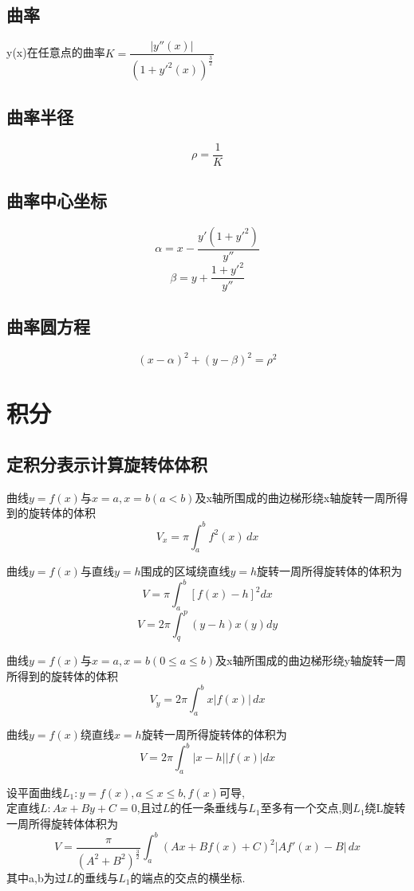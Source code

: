\subsection{曲率}
y(x)在任意点的曲率\(K = \dfrac{|y''(x)|}{(1 + y'^2(x))^{\frac{3}{2}}}\)

\subsection{曲率半径}
\[\rho = \dfrac{1}{K}\]

\subsection{曲率中心坐标}
\[\alpha = x - \dfrac{y'(1 + y'^2)}{y''}\]
\[\beta = y + \dfrac{1 + y'^2}{y''}\]

\subsection{曲率圆方程}
\[(x - \alpha)^2 + (y - \beta)^2 = \rho^2\]



\section{积分}

\subsection{定积分表示计算旋转体体积}

曲线\(y=f(x)\)与\(x=a,x=b(a < b)\)及x轴所围成的曲边梯形绕x轴旋转一周所得到的旋转体的体积
\begin{displaymath}
V_{x} = \pi \int_{a}^{b} f^{2}(x) \,dx
\end{displaymath}

曲线\(y = f(x)\)与直线\(y = h\)围成的区域绕直线\(y = h\)旋转一周所得旋转体的体积为\[V = \pi\int_a^b[f(x) - h]^2dx\]
\[V = 2\pi\int_q^p(y - h)x(y)dy\]

曲线\(y=f(x)\)与\(x=a,x=b(0 \leq a \leq b)\)及x轴所围成的曲边梯形绕y轴旋转一周所得到的旋转体的体积
\begin{displaymath}
V_{y} = 2\pi \int_{a}^{b} x \lvert f(x) \rvert \,dx
\end{displaymath}

曲线\(y = f(x)\)绕直线\(x = h\)旋转一周所得旋转体的体积为\[V = 2\pi\int_a^b|x - h||f(x)|dx\]

设平面曲线\(L_1 : y = f(x), a \leq x \leq b, f(x)\)可导, \\
定直线\(L : Ax + By + C = 0\),且过\(L\)的任一条垂线与\(L_1\)至多有一个交点,则\(L_1\)绕L旋转一周所得旋转体体积为
\begin{displaymath}
V = \frac{\pi}{(A^2 + B^2)^{\frac{3}{2}}}
\int_{a}^{b} (Ax + Bf(x) + C)^2 \lvert Af'(x) - B \rvert \,dx
\end{displaymath}
其中a,b为过\(L\)的垂线与\(L_1\)的端点的交点的横坐标.


